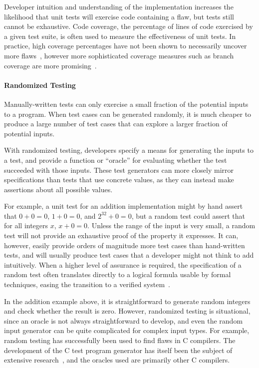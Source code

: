 Developer intuition and understanding of the implementation increases
the likelihood that unit tests will exercise code containing a flaw,
but tests still cannot be exhaustive. Code coverage, the percentage of
lines of code exercised by a given test suite, is often used to
measure the effectiveness of unit tests. In practice, high coverage
percentages have not been shown to necessarily uncover more
flaws~\cite{inozemtseva2014coverage}, however more sophisticated
coverage measures such as branch coverage are more
promising~\cite{gligoric2013comparing}.


\paragraph{Randomized Testing}

Manually-written tests can only exercise a small fraction of the
potential inputs to a program. When test cases can be generated
randomly, it is much cheaper to produce a large number of test cases
that can explore a larger fraction of potential inputs.

With randomized testing, developers specify a means for generating the
inputs to a test, and provide a function or ``oracle'' for evaluating
whether the test succeeded with those inputs. These test generators
can more closely mirror specifications than tests that use concrete
values, as they can instead make assertions about all possible
values.

For example, a unit test for an addition implementation might by hand
assert that $0+0=0$, $1+0=0$, and $2^{32}+0=0$, but a random test
could assert that for all integers $x$, $x+0=0$. Unless the range of
the input is very small, a random test will not provide an exhaustive
proof of the property it expresses. It can, however, easily provide
orders of magnitude more test cases than hand-written tests, and will
usually produce test cases that a developer might not think to add
intuitively. When a higher level of assurance is required, the
specification of a random test often translates directly to a logical
formula usable by formal techniques, easing the transition to a
verified system~\cite{swierstra2012xmonad}.

In the addition example above, it is straightforward to generate
random integers and check whether the result is zero. However,
randomized testing is situational, since an oracle is not always
straightforward to develop, and even the random input generator can be
quite complicated for complex input types. For example, random testing
has successfully been used to find flaws in C compilers. The
development of the C test program generator has itself been the
subject of extensive research~\cite{yang2011finding}, and the oracles
used are primarily other C compilers.

